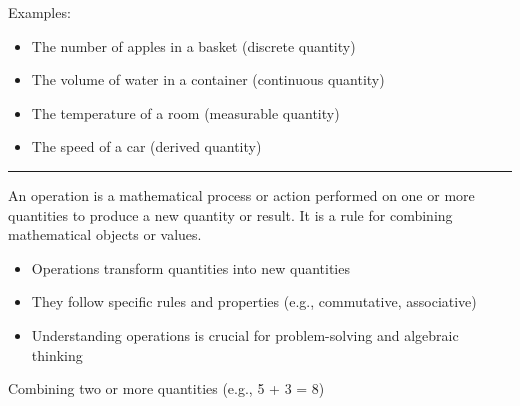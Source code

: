 \documentclass[
  letterpaper,
  DIV=11,
  numbers=noendperiod]{scrartcl}
\providecommand{\tightlist}{%
  \setlength{\itemsep}{0pt}\setlength{\parskip}{0pt}}\usepackage{longtable,booktabs,array}
\begin{document}
Examples:

\begin{itemize}
\tightlist
\item
  The number of apples in a basket (discrete quantity)
\item
  The volume of water in a container (continuous quantity)
\item
  The temperature of a room (measurable quantity)
\item
  The speed of a car (derived quantity)
\end{itemize}

\begin{center}\rule{0.5\linewidth}{0.5pt}\end{center}

\begin{tcolorbox}[enhanced jigsaw, rightrule=.15mm, toprule=.15mm, colbacktitle=quarto-callout-note-color!10!white, title={Operation}, arc=.35mm, opacityback=0, left=2mm, toptitle=1mm, colback=white, breakable, coltitle=black, leftrule=.75mm, bottomtitle=1mm, titlerule=0mm, bottomrule=.15mm, opacitybacktitle=0.6, colframe=quarto-callout-note-color-frame]

An operation is a mathematical process or action performed on one or
more quantities to produce a new quantity or result. It is a rule for
combining mathematical objects or values.

\end{tcolorbox}

\begin{itemize}
\tightlist
\item
  Operations transform quantities into new quantities
\item
  They follow specific rules and properties (e.g., commutative,
  associative)
\item
  Understanding operations is crucial for problem-solving and algebraic
  thinking
\end{itemize}

\begin{tcolorbox}[enhanced jigsaw, rightrule=.15mm, toprule=.15mm, colbacktitle=quarto-callout-tip-color!10!white, title=\textcolor{quarto-callout-tip-color}{\faLightbulb}\hspace{0.5em}{Addition (sum)}, arc=.35mm, opacityback=0, left=2mm, toptitle=1mm, colback=white, breakable, coltitle=black, leftrule=.75mm, bottomtitle=1mm, titlerule=0mm, bottomrule=.15mm, opacitybacktitle=0.6, colframe=quarto-callout-tip-color-frame]

Combining two or more quantities (e.g., 5 + 3 = 8)

\end{tcolorbox}
\end{document}
